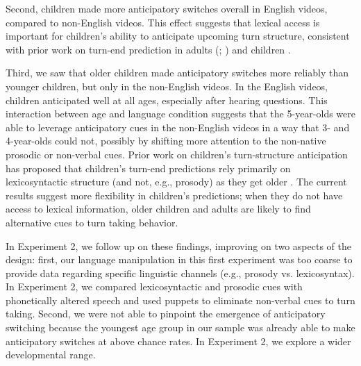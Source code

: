 \documentclass[authoryear, 12pt]{elsarticle}
\begin{document}
Second, children made more anticipatory switches overall in English videos, compared to non-English videos. This effect suggests that lexical access is important for children's ability to anticipate upcoming turn structure, consistent with prior work on turn-end prediction in adults (\citealp{de-ruiter2006}; \citealp{magyari2012}) and children \citep{keitel2013}.

Third, we saw that older children made anticipatory switches more reliably than younger children, but only in the non-English videos. In the English videos, children anticipated well at all ages, especially after hearing questions. This interaction between age and language condition suggests that the 5-year-olds were able to leverage anticipatory cues in the non-English videos in a way that 3- and 4-year-olds could not, possibly by shifting more attention to the non-native prosodic or non-verbal cues. Prior work on children's turn-structure anticipation has proposed that children's turn-end predictions rely primarily on lexicosyntactic structure (and not, e.g., prosody) as they get older \citep{keitel2013}. The current results suggest more flexibility in children's predictions; when they do not have access to lexical information, older children and adults are likely to find alternative cues to turn taking behavior.

In Experiment 2, we follow up on these findings, improving on two aspects of the design: first, our language manipulation in this first experiment was too coarse to provide data regarding specific linguistic channels (e.g., prosody vs. lexicosyntax). In Experiment 2, we compared lexicosyntactic and prosodic cues with phonetically altered speech and used puppets to eliminate non-verbal cues to turn taking. Second, we were not able to pinpoint the emergence of anticipatory switching because the youngest age group in our sample was already able to make anticipatory switches at above chance rates. In Experiment 2, we explore a wider developmental range. 

\end{document}
